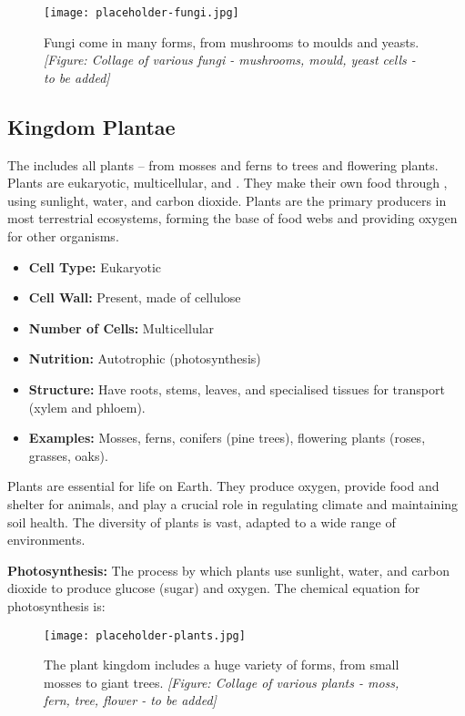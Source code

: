 \begin{figure}
\centering
\texttt{[image: placeholder-fungi.jpg]}
\caption{Fungi come in many forms, from mushrooms to moulds and yeasts. \textit{[Figure: Collage of various fungi - mushrooms, mould, yeast cells - to be added]}}
\end{figure}


\subsection{Kingdom Plantae}

The  includes all plants – from mosses and ferns to trees and flowering plants. Plants are eukaryotic, multicellular, and . They make their own food through , using sunlight, water, and carbon dioxide. Plants are the primary producers in most terrestrial ecosystems, forming the base of food webs and providing oxygen for other organisms.

\begin{itemize}
    \item \textbf{Cell Type:} Eukaryotic
    \item \textbf{Cell Wall:} Present, made of cellulose
    \item \textbf{Number of Cells:} Multicellular
    \item \textbf{Nutrition:} Autotrophic (photosynthesis)
    \item \textbf{Structure:}  Have roots, stems, leaves, and specialised tissues for transport (xylem and phloem).
    \item \textbf{Examples:} Mosses, ferns, conifers (pine trees), flowering plants (roses, grasses, oaks).
\end{itemize}

Plants are essential for life on Earth. They produce oxygen, provide food and shelter for animals, and play a crucial role in regulating climate and maintaining soil health.  The diversity of plants is vast, adapted to a wide range of environments.

\begin{marginnote}
\textbf{Photosynthesis:} The process by which plants use sunlight, water, and carbon dioxide to produce glucose (sugar) and oxygen. The chemical equation for photosynthesis is:
\end{marginnote}

\begin{figure}
\centering
\texttt{[image: placeholder-plants.jpg]}
\caption{The plant kingdom includes a huge variety of forms, from small mosses to giant trees. \textit{[Figure: Collage of various plants - moss, fern, tree, flower - to be added]}}
\end{figure}


